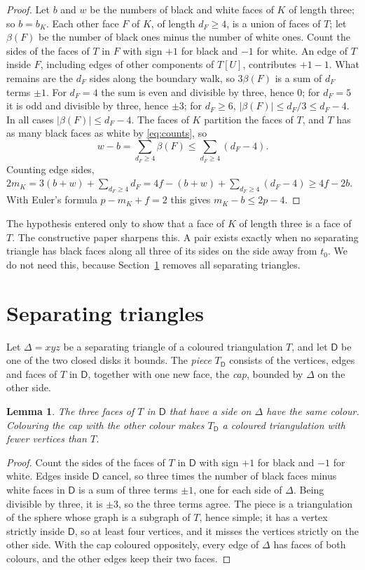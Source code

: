 \documentclass[10pt]{amsart}
\numberwithin{equation}{section}
\newtheorem{lemma}[equation]{Lemma}
\theoremstyle{definition}
\theoremstyle{remark}
\newcommand{\T}{T}
\begin{document}
\begin{proof}
Let $b$ and $w$ be the numbers of black and white faces of $K$ of length three; so $b=b_K$.
Each other face $F$ of $K$, of length $d_F\ge4$, is a union of faces of $\T$; let $\beta(F)$ be the number of black ones minus the number of white ones.
Count the sides of the faces of $\T$ in $F$ with sign $+1$ for black and $-1$ for white.
An edge of $\T$ inside $F$, including edges of other components of $\T[U]$, contributes $+1-1$.
What remains are the $d_F$ sides along the boundary walk, so $3\beta(F)$ is a sum of $d_F$ terms $\pm1$.
For $d_F=4$ the sum is even and divisible by three, hence $0$; for $d_F=5$ it is odd and divisible by three, hence $\pm3$; for $d_F\ge6$, $|\beta(F)|\le d_F/3\le d_F-4$.
In all cases $|\beta(F)|\le d_F-4$.
The faces of $K$ partition the faces of $\T$, and $\T$ has as many black faces as white by \eqref{eq:counts}, so
\[
w-b=\sum_{d_F\ge4}\beta(F)\le\sum_{d_F\ge4}(d_F-4).
\]
Counting edge sides, $2m_K=3(b+w)+\sum_{d_F\ge4}d_F=4f-(b+w)+\sum_{d_F\ge4}(d_F-4)\ge4f-2b$.
With Euler's formula $p-m_K+f=2$ this gives $m_K-b\le 2p-4$.
\end{proof}

The hypothesis entered only to show that a face of $K$ of length three is a face of $\T$.
The constructive paper \cite{constructive2026} sharpens this. A pair exists exactly when no separating triangle has black faces along all three of its sides on the side away from $t_0$.
We do not need this, because Section~\ref{sec:glue} removes all separating triangles.

\section{Separating triangles}\label{sec:glue}

Let $\Delta=xyz$ be a separating triangle of a coloured triangulation $\T$, and let $\mathsf{D}$ be one of the two closed disks it bounds.
The \emph{piece} $\T_{\mathsf{D}}$ consists of the vertices, edges and faces of $\T$ in $\mathsf{D}$, together with one new face, the \emph{cap}, bounded by $\Delta$ on the other side.

\begin{lemma}\label{lem:cap}
The three faces of $\T$ in $\mathsf{D}$ that have a side on $\Delta$ have the same colour.
Colouring the cap with the other colour makes $\T_{\mathsf{D}}$ a coloured triangulation with fewer vertices than $\T$.
\end{lemma}

\begin{proof}
Count the sides of the faces of $\T$ in $\mathsf{D}$ with sign $+1$ for black and $-1$ for white.
Edges inside $\mathsf{D}$ cancel, so three times the number of black faces minus white faces in $\mathsf{D}$ is a sum of three terms $\pm1$, one for each side of $\Delta$.
Being divisible by three, it is $\pm3$, so the three terms agree.
The piece is a triangulation of the sphere whose graph is a subgraph of $\T$, hence simple; it has a vertex strictly inside $\mathsf{D}$, so at least four vertices, and it misses the vertices strictly on the other side.
With the cap coloured oppositely, every edge of $\Delta$ has faces of both colours, and the other edges keep their two faces.
\end{proof}
\end{document}
